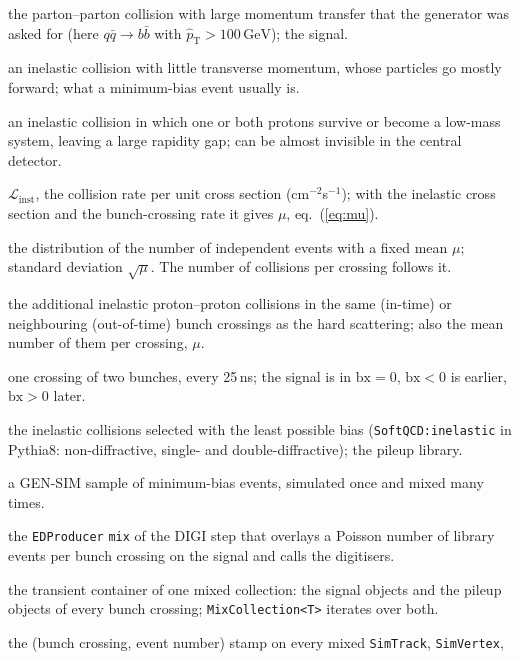 \documentclass[11pt,a4paper]{article}
\newcommand{\code}[1]{\texttt{#1}}
\newcommand{\bx}{\ensuremath{\mathrm{bx}}}
\newcommand{\bbbar}{\ensuremath{b\bar{b}}}
\newcommand{\GeV}{\,\mathrm{GeV}}
\newcommand{\ptHat}{\ensuremath{\hat{p}_{\mathrm{T}}}}
\begin{document}
\sloppy
\begin{description}[style=sameline,leftmargin=0pt,itemsep=2pt]
\item[hard scattering] the parton--parton collision with large momentum transfer that the generator was asked
  for (here $q\bar q\to\bbbar$ with $\ptHat>100\GeV$); the signal.
\item[soft collision] an inelastic collision with little transverse momentum, whose particles go mostly
  forward; what a minimum-bias event usually is.
\item[diffractive collision] an inelastic collision in which one or both protons survive or become a low-mass
  system, leaving a large rapidity gap; can be almost invisible in the central detector.
\item[instantaneous luminosity] $\mathcal{L}_{\mathrm{inst}}$, the collision rate per unit cross section
  (cm$^{-2}$s$^{-1}$); with the inelastic cross section and the bunch-crossing rate it gives $\mu$,
  eq.~(\ref{eq:mu}).
\item[Poisson distribution] the distribution of the number of independent events with a fixed mean $\mu$;
  standard deviation $\sqrt{\mu}$. The number of collisions per crossing follows it.
\item[pileup (PU)] the additional inelastic proton--proton collisions in the same (in-time) or neighbouring
  (out-of-time) bunch crossings as the hard scattering; also the mean number of them per crossing, $\mu$.
\item[bunch crossing (bx)] one crossing of two bunches, every 25\,ns; the signal is in $\bx=0$, $\bx<0$ is
  earlier, $\bx>0$ later.
\item[minimum bias] the inelastic collisions selected with the least possible bias (\code{SoftQCD:inelastic}
  in Pythia8: non-diffractive, single- and double-diffractive); the pileup library.
\item[pileup library] a GEN-SIM sample of minimum-bias events, simulated once and mixed many times.
\item[MixingModule] the \code{EDProducer} \code{mix} of the DIGI step that overlays a Poisson number of library
  events per bunch crossing on the signal and calls the digitisers.
\item[CrossingFrame$<$T$>$] the transient container of one mixed collection: the signal objects and the
  pileup objects of every bunch crossing; \code{MixCollection<T>} iterates over both.
\item[EncodedEventId] the (bunch crossing, event number) stamp on every mixed \code{SimTrack}, \code{SimVertex},

\end{description}
\end{document}
